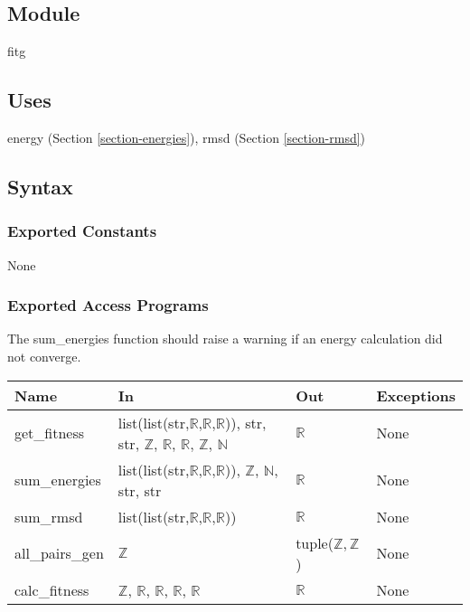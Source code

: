 \documentclass[12pt, titlepage]{article}
\begin{document}
\subsection{Module}

fitg

\subsection{Uses}

energy (Section \ref{section-energies}), rmsd (Section \ref{section-rmsd})

\subsection{Syntax}

\subsubsection{Exported Constants}

None

\subsubsection{Exported Access Programs}

The sum\_energies function should raise a warning if an energy calculation did 
not converge.

\begin{center}
	\begin{tabular}{p{2cm} p{4cm} p{4cm} p{2cm}}
		\hline
		\textbf{Name} & \textbf{In} & \textbf{Out} & \textbf{Exceptions} \\
		\hline
		get\_fitness & list(list(str,$\mathbb{R}$,$\mathbb{R}$,$\mathbb{R}$)), 
		str, str, $\mathbb{Z}$, $\mathbb{R}$, 
		$\mathbb{R}$, $\mathbb{Z}$, $\mathbb{N}$ & $\mathbb{R}$ & None \\
		sum\_energies &  
		list(list(str,$\mathbb{R}$,$\mathbb{R}$,$\mathbb{R}$)), $\mathbb{Z}$, 
		$\mathbb{N}$, str, str & $\mathbb{R}$ 
		& None \\
		sum\_rmsd &  list(list(str,$\mathbb{R}$,$\mathbb{R}$,$\mathbb{R}$)) & 
		$\mathbb{R}$ & None \\
		all\_pairs\_gen & $\mathbb{Z}$ & tuple($\mathbb{Z}, \mathbb{Z}$) & None 
		\\
		calc\_fitness & $\mathbb{Z}$, $\mathbb{R}$, $\mathbb{R}$, $\mathbb{R}$, 
		$\mathbb{R}$ & $\mathbb{R}$ & None \\
		\hline
	\end{tabular}
\end{center}
\end{document}
